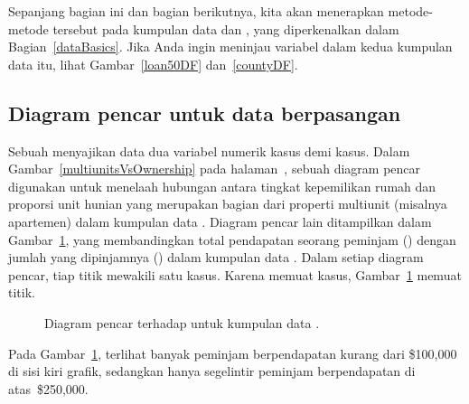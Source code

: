 Sepanjang bagian ini dan bagian berikutnya, kita akan menerapkan
metode-metode tersebut pada kumpulan data  dan
, yang diperkenalkan dalam Bagian~\ref{dataBasics}.
Jika Anda ingin meninjau variabel dalam kedua kumpulan data itu,
lihat Gambar~\ref{loan50DF} dan~\ref{countyDF}.


\subsection{Diagram pencar untuk data berpasangan}
\label{scatterPlots}


Sebuah  menyajikan data dua variabel numerik
kasus demi kasus.
Dalam Gambar~\ref{multiunitsVsOwnership} pada
halaman~\pageref{multiunitsVsOwnership}, sebuah diagram pencar
digunakan untuk menelaah hubungan antara tingkat kepemilikan rumah
dan proporsi unit hunian yang merupakan bagian dari properti
multiunit (misalnya apartemen) dalam kumpulan data .
Diagram pencar lain ditampilkan dalam Gambar~\ref{loan50_amt_vs_income},
yang membandingkan total pendapatan seorang peminjam
() dengan jumlah yang dipinjamnya
() dalam kumpulan data .
Dalam setiap diagram pencar, tiap titik mewakili satu kasus.
Karena  memuat \loanN{} kasus,
Gambar~\ref{loan50_amt_vs_income} memuat \loanN{} titik.

\begin{figure}[h]
  \centering
  \caption{Diagram pencar 
      terhadap  untuk kumpulan data
      .}
  \label{loan50_amt_vs_income}
\end{figure}

Pada Gambar~\ref{loan50_amt_vs_income},
terlihat banyak peminjam berpendapatan kurang dari
\$100,000 di sisi kiri grafik, sedangkan hanya segelintir
peminjam berpendapatan di atas~\$250,000.

